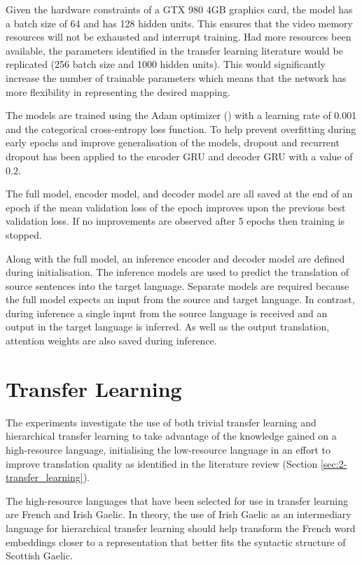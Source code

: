 Given the hardware constraints of a GTX 980 4GB graphics card, the model has a batch size of 64 and has 128 hidden units. This ensures that the video memory resources will not be exhausted and interrupt training. Had more resources been available, the parameters identified in the transfer learning literature would be replicated (256 batch size and 1000 hidden units). This would significantly increase the number of trainable parameters which means that the network has more flexibility in representing the desired mapping.

The models are trained using the Adam optimizer (\cite{adam_optimizer_2014}) with a learning rate of 0.001 and the categorical cross-entropy loss function. To help prevent overfitting during early epochs and improve generalisation of the models, dropout and recurrent dropout has been applied to the encoder \acrshort{GRU} and decoder \acrshort{GRU} with a value of $0.2$.

The full model, encoder model, and decoder model are all saved at the end of an epoch if the mean validation loss of the epoch improves upon the previous best validation loss. If no improvements are observed after 5 epochs then training is stopped.


Along with the full model, an inference encoder and decoder model are defined during initialisation. The inference models are used to predict the translation of source sentences into the target language. Separate models are required because the full model expects an input from the source and target language. In contrast, during inference a single input from the source language is received and an output in the target language is inferred. As well as the output translation, attention weights are also saved during inference.

\section{Transfer Learning}
\label{sec:3-transfer_learning}

The experiments investigate the use of both trivial transfer learning and hierarchical transfer learning to take advantage of the knowledge gained on a high-resource language, initialising the low-resource language in an effort to improve translation quality as identified in the literature review (Section \ref{sec:2-transfer_learning}).

The high-resource languages that have been selected for use in transfer learning are French and Irish Gaelic. In theory, the use of Irish Gaelic as an intermediary language for hierarchical transfer learning should help transform the French word embeddings closer to a representation that better fits the syntactic structure of Scottish Gaelic.


